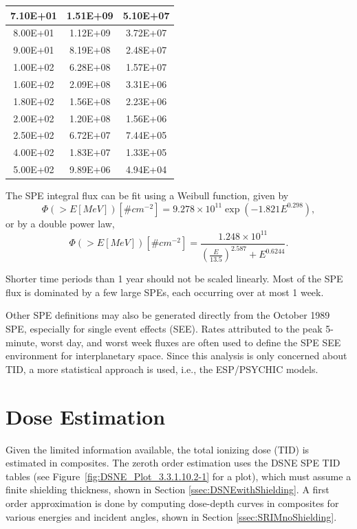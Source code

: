 \documentclass{hitec}
\begin{document}
\begin{table}[h]
{\begin{tabular}{|c|c|c|}
			7.10E+01 & 1.51E+09 & 5.10E+07 \\ \hline
			8.00E+01 & 1.12E+09 & 3.72E+07 \\ \hline
			9.00E+01 & 8.19E+08 & 2.48E+07 \\ \hline
			1.00E+02 & 6.28E+08 & 1.57E+07 \\ \hline
			1.60E+02 & 2.09E+08 & 3.31E+06 \\ \hline
			1.80E+02 & 1.56E+08 & 2.23E+06 \\ \hline
			2.00E+02 & 1.20E+08 & 1.56E+06 \\ \hline
			2.50E+02 & 6.72E+07 & 7.44E+05 \\ \hline
			4.00E+02 & 1.83E+07 & 1.33E+05 \\ \hline
			5.00E+02 & 9.89E+06 & 4.94E+04 \\ \hline
		\end{tabular}%
	}

\end{table}

The SPE integral flux can be fit using a Weibull function, given by
\begin{equation}
\Phi(>E[MeV]) [\# cm^{-2}] = 9.278\times 10^{11} \exp\left(-1.821E^{0.298}\right),
\end{equation}
or by a double power law,
\begin{equation}
\Phi(>E[MeV]) [\# cm^{-2}] = \frac{1.248\times 10^{11}}{\left(\frac{E}{13.5}\right)^{2.587} + E^{0.6244}}.
\end{equation}

Shorter time periods than 1 year should not be scaled linearly. Most of the SPE flux is dominated by a few large SPEs, each occurring over at most 1 week.

Other SPE definitions may also be generated directly from the October 1989 SPE, especially for single event effects (SEE). Rates attributed to the peak 5-minute, worst day, and worst week fluxes are often used to define the SPE SEE environment for interplanetary space. Since this analysis is only concerned about TID, a more statistical approach is used, i.e., the ESP/PSYCHIC models.

\section{Dose Estimation}

Given the limited information available, the total ionizing dose (TID) is estimated in composites. The zeroth order estimation uses the DSNE SPE TID tables (see Figure~\ref{fig:DSNE_Plot_3.3.1.10.2-1} for a plot), which must assume a finite shielding thickness, shown in Section \ref{ssec:DSNEwithShielding}. A first order approximation is done by computing dose-depth curves in composites for various energies and incident angles, shown in Section \ref{ssec:SRIMnoShielding}.
\end{document}
